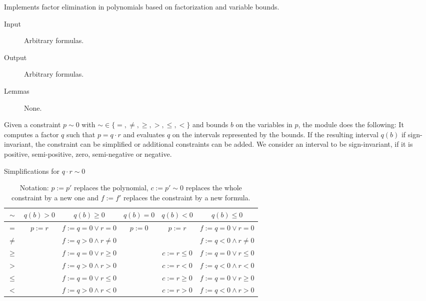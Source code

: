 Implements factor elimination in polynomials based on factorization and variable bounds.

\begin{description}
	\item[Input] Arbitrary formulas.
	\item[Output] Arbitrary formulas.
	\item[Lemmas] None.
\end{description}

Given a constraint $p \sim 0$ with $\sim \in \{ =, \neq, \geq, >, \leq, < \}$ and bounds $b$ on the variables in $p$, the module does the following:
It computes a factor $q$ such that $p = q \cdot r$ and evaluates $q$ on the intervals represented by the bounds.
If the resulting interval $q(b)$ if sign-invariant, the constraint can be simplified or additional constraints can be added.
We consider an interval to be sign-invariant, if it is positive, semi-positive, zero, semi-negative or negative.

\begin{table}
\begin{center}
\caption{Simplifications for $q \cdot r \sim 0$}
\begin{tabular}{|c||c|c|c|c|c|}
\hline
$\sim$ & $q(b) > 0$ & $q(b) \geq 0$ & $q(b) = 0$ & $q(b) < 0$ & $q(b) \leq 0$ \\
\hline\hline
$=$ & \multirow{6}{*}{$p := r$} & $f := q=0 \vee r=0$ & \multirow{6}{*}{$p := 0$} & \multirow{2}{*}{$p := r$} & $f := q=0 \vee r=0$ \\
\cline{1-1}\cline{3-3}\cline{6-6}
$\neq$ & & $f := q>0 \wedge r \neq 0$ & & & $f := q<0 \wedge r \neq 0$ \\
\cline{1-1}\cline{3-3}\cline{5-6}
$\geq$ & & $f := q=0 \vee r \geq 0$ & & $c := r \leq 0$ & $f := q=0 \vee r \leq 0$ \\
\cline{1-1}\cline{3-3}\cline{5-6}
$>$ & & $f := q>0 \wedge r>0$ & & $c := r<0$ & $f := q<0 \wedge r<0$ \\
\cline{1-1}\cline{3-3}\cline{5-6}
$\leq$ & & $f := q=0 \vee r \leq 0$ & & $c := r \geq 0$ & $f := q=0 \vee r \geq 0$ \\
\cline{1-1}\cline{3-3}\cline{5-6}
$<$ & & $f := q>0 \wedge r<0$ & & $c := r>0$ &  $f := q<0 \wedge r>0$ \\
\hline
\end{tabular}
\caption{Notation: $p := p'$ replaces the polynomial, $c := p' \sim 0$ replaces the whole constraint by a new one and $f := f'$ replaces the constraint by a new formula.}
\end{center}
\end{table}

